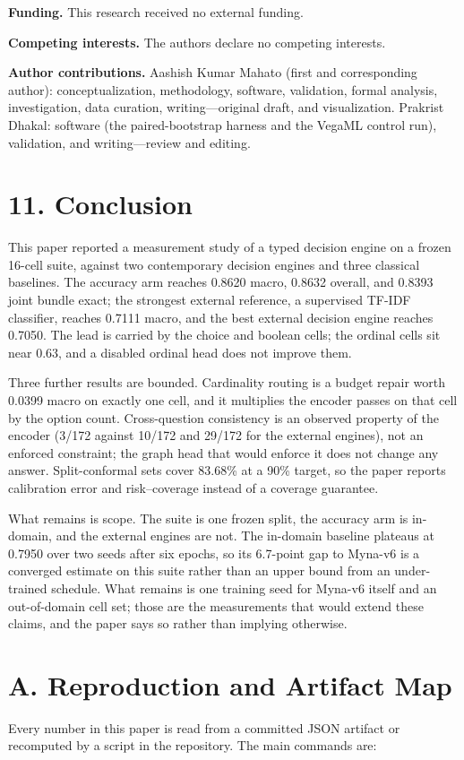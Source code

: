 \documentclass[11pt]{article}
\begin{document}
\textbf{Funding.} This research received no external funding.

\textbf{Competing interests.} The authors declare no competing interests.

\textbf{Author contributions.} Aashish Kumar Mahato (first and corresponding author):
conceptualization, methodology, software,
validation, formal analysis, investigation, data curation, writing---original draft, and
visualization. Prakrist Dhakal: software (the paired-bootstrap harness and the VegaML control
run), validation, and writing---review and editing.

\section*{11. Conclusion}
This paper reported a measurement study of a typed decision engine on a frozen 16-cell suite,
against two contemporary decision engines and three classical baselines. The accuracy arm reaches
0.8620 macro, 0.8632 overall, and 0.8393 joint bundle exact; the strongest external reference, a
supervised TF-IDF classifier, reaches 0.7111 macro, and the best external decision engine reaches
0.7050. The lead is carried by the choice and boolean cells; the ordinal cells sit near 0.63, and a
disabled ordinal head does not improve them.

Three further results are bounded. Cardinality routing is a budget repair worth 0.0399 macro on
exactly one cell, and it multiplies the encoder passes on that cell by the option count.
Cross-question consistency is an observed property of the encoder (3/172 against 10/172 and 29/172
for the external engines), not an enforced constraint; the graph head that would enforce it does not
change any answer. Split-conformal sets cover 83.68\% at a 90\% target, so the paper reports
calibration error and risk--coverage instead of a coverage guarantee.

What remains is scope. The suite is one frozen split, the accuracy arm is in-domain, and the
external engines are not. The in-domain baseline plateaus at 0.7950 over two seeds after six
epochs, so its 6.7-point gap to Myna-v6{} is a converged estimate on this suite rather than an upper
bound from an under-trained schedule. What remains is one training seed for Myna-v6{} itself and an out-of-domain
cell set; those are the measurements that would extend these claims, and the paper says so rather
than implying otherwise.



\section*{A. Reproduction and Artifact Map}
Every number in this paper is read from a committed JSON artifact or recomputed by a script in the
repository. The main commands are:
\end{document}
